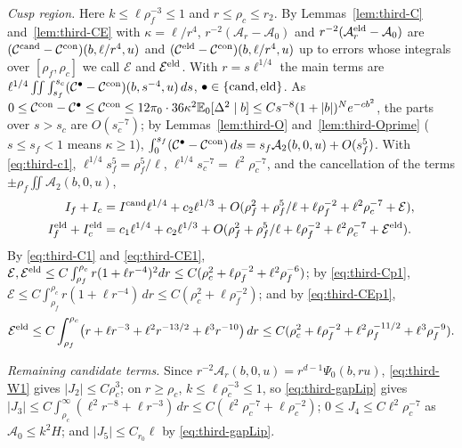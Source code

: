 \emph{Cusp region.} Here $k\le\ell\rho_f^{-3}\le1$ and $r\le\rho_c\le r_2$. By Lemmas~\ref{lem:third-C} and~\ref{lem:third-CE} with $\kappa=\ell/r^4$, $r^{-2}(\mathcal A_r-\mathcal A_0)$ and $r^{-2}(\mathcal A^{\mathrm{eld}}_r-\mathcal A_0)$ are $(\mathcal C^{\mathrm{cand}}-\mathcal C^{\rm con})(b,\ell/r^4,u)$ and $(\mathcal C^{\mathrm{eld}}-\mathcal C^{\rm con})(b,\ell/r^4,u)$ up to errors whose integrals over $[\rho_f,\rho_c]$ we call $\mathcal E$ and $\mathcal E^{\mathrm{eld}}$. With $r=s\ell^{1/4}$ the main terms are $\ell^{1/4}\iint\int_{s_f}^{s_c}(\mathcal C^\bullet-\mathcal C^{\rm con})(b,s^{-4},u)\,ds$, $\bullet\in\{\mathrm{cand},\mathrm{eld}\}$. As $0\le\mathcal C^{\rm con}-\mathcal C^\bullet\le\mathcal C^{\rm con}\le12\pi_0\cdot36\kappa^2\mathbb E_0[\Delta^2\mid b]\le Cs^{-8}(1+|b|)^Ne^{-cb^2}$, the parts over $s>s_c$ are $O(s_c^{-7})$; by Lemmas~\ref{lem:third-O} and~\ref{lem:third-Oprime} ($s\le s_f<1$ means $\kappa\ge1$), $\int_0^{s_f}(\mathcal C^\bullet-\mathcal C^{\rm con})\,ds=s_f\mathcal A_2(b,0,u)+O(s_f^5)$. With \eqref{eq:third-c1}, $\ell^{1/4}s_f^5=\rho_f^5/\ell$, $\ell^{1/4}s_c^{-7}=\ell^2\rho_c^{-7}$, and the cancellation of the terms $\pm\rho_f\iint \mathcal A_2(b,0,u)$,
\begin{equation}\label{eq:third-FK}
\begin{aligned}
I_f+I_c&=I^{\mathrm{cand}}\ell^{1/4}+c_2\ell^{1/3}+O(\rho_f^2+\rho_f^5/\ell+\ell\rho_f^{-2}+\ell^2\rho_c^{-7}+\mathcal E),\\
I^{\mathrm{eld}}_f+I^{\mathrm{eld}}_c&=c_1\ell^{1/4}+c_2\ell^{1/3}+O(\rho_f^2+\rho_f^5/\ell+\ell\rho_f^{-2}+\ell^2\rho_c^{-7}+\mathcal E^{\mathrm{eld}}).
\end{aligned}
\end{equation}
By \eqref{eq:third-C1} and \eqref{eq:third-CE1}, $\mathcal E,\mathcal E^{\mathrm{eld}}\le C\int_{\rho_f}^{\rho_c}r(1+\ell r^{-4})^2dr\le C(\rho_c^2+\ell\rho_f^{-2}+\ell^2\rho_f^{-6})$; by \eqref{eq:third-Cp1}, $\mathcal E\le C\int_{\rho_f}^{\rho_c}r(1+\ell r^{-4})\,dr\le C(\rho_c^2+\ell\rho_f^{-2})$; and by \eqref{eq:third-CEp1},
\[
\mathcal E^{\mathrm{eld}}\le C\int_{\rho_f}^{\rho_c}\bigl(r+\ell r^{-3}+\ell^2r^{-13/2}+\ell^3r^{-10}\bigr)\,dr\le C(\rho_c^2+\ell\rho_f^{-2}+\ell^2\rho_f^{-11/2}+\ell^3\rho_f^{-9}).
\]

\emph{Remaining candidate terms.} Since $r^{-2}\mathcal A_r(b,0,u)=r^{d-1}\Psi_0(b,ru)$, \eqref{eq:third-W1} gives $|J_2|\le C\rho_c^3$; on $r\ge\rho_c$, $k\le\ell\rho_c^{-3}\le1$, so \eqref{eq:third-gapLip} gives $|J_3|\le C\int_{\rho_c}^\infty(\ell^2r^{-8}+\ell r^{-3})\,dr\le C(\ell^2\rho_c^{-7}+\ell\rho_c^{-2})$; $0\le J_4\le C\ell^2\rho_c^{-7}$ as $\mathcal A_0\le k^2H$; and $|J_5|\le C_{r_0}\ell$ by \eqref{eq:third-gapLip}.

